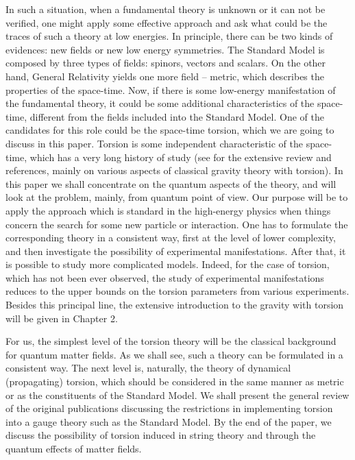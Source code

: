 In such a situation, when a fundamental theory is unknown or it 
can not be verified, one might apply some effective approach and 
ask what could be the traces of such 
a theory at low energies. In principle, there can be two kinds of 
evidences: new fields or new low energy symmetries. 
The Standard Model is composed by three
types of fields: spinors, vectors and scalars. On the other hand, 
General Relativity yields one more field -- metric, which describes the 
properties of the space-time. Now, if there is some low-energy 
manifestation of the fundamental theory, it 
could be some additional characteristics of the space-time, different 
from the fields included into the Standard Model. 
One of the candidates for this
role could be the space-time torsion, which we are going to discuss in this 
paper. Torsion is some independent characteristic of the space-time, 
which has a very long history of study (see \cite{hehl} for the 
extensive review and references, 
mainly on various aspects of classical gravity theory with torsion).
In this paper we shall concentrate on the quantum
aspects of the theory, and will look at the problem, mainly, from 
quantum point of view.  Our purpose will be to apply 
the approach which is standard in the high-energy physics when things 
concern the search for some new particle or interaction. 
One has to formulate the 
corresponding theory in a consistent way, first at the level of lower 
complexity,
and then investigate the possibility of experimental manifestations. 
After that, 
it is possible to study more complicated models. Indeed, for the case of 
torsion, which has not been ever observed, the study of experimental 
manifestations 
reduces to the upper bounds on the torsion parameters from various 
experiments.
Besides this principal line, the extensive introduction 
to the gravity with torsion will be given in Chapter 2.

For us, the simplest level of the torsion theory will be the 
classical background for quantum matter fields. As we shall 
see, such a theory can be formulated in a consistent way. The 
next level is, naturally, the theory of dynamical (propagating) 
torsion, which should be considered in the same manner as metric 
or as the constituents of the Standard Model. We shall present 
the general review of the original publications \cite{betor,guhesh} 
discussing the restrictions in implementing torsion into a gauge 
theory such as the Standard Model.  
By the end of the paper, we discuss the possibility of torsion 
induced in string theory and through the quantum effects of 
matter fields.

